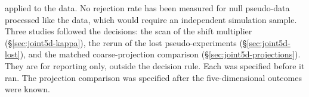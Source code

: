 applied to the data. No rejection rate has been measured for null pseudo-data processed like the data, which would require an independent simulation sample. Three studies followed the decisions: the scan of the shift multiplier (\S\ref{sec:joint5d-kappa}), the rerun of the lost pseudo-experiments (\S\ref{sec:joint5d-lost}), and the matched coarse-projection comparison (\S\ref{sec:joint5d-projections}). They are for reporting only, outside the decision rule. Each was specified before it ran. The projection comparison was specified after the five-dimensional outcomes were known.

